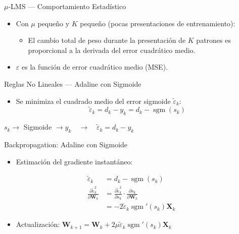 \documentclass[aspectratio=169,utf8,spanish]{beamer}
\DeclareMathOperator{\sgm}{sgm}
\begin{document}
\begin{frame}{$\mu$-LMS — Comportamiento Estadístico}
  \begin{itemize}
    \item Con $\mu$ pequeño y $K$ pequeño (pocas presentaciones de entrenamiento):
    \begin{itemize}
      \item El cambio total de peso durante la presentación de $K$ patrones es proporcional a la derivada del error cuadrático medio.
    \end{itemize}
    \item $\varepsilon$ es la función de error cuadrático medio (MSE).
  \end{itemize}
\end{frame}

\begin{frame}{Reglas No Lineales — Adaline con Sigmoide}
  \begin{itemize}
    \item Se minimiza el cuadrado medio del error sigmoide $\tilde{\varepsilon}_k$:
    \begin{equation*}
      \tilde{\varepsilon}_k = d_k - y_k = d_k - \sgm(s_k)
    \end{equation*}
  \end{itemize}

  \begin{center}
    $s_k \to$ Sigmoide $\to y_k \quad\to\quad \tilde{\varepsilon}_k = d_k - y_k$
  \end{center}
\end{frame}


\begin{frame}{Backpropagation: Adaline con Sigmoide}
  \begin{itemize}
    \item Estimación del gradiente instantáneo:
  \end{itemize}
  \begin{align*}
    \tilde{\varepsilon}_k &= d_k - \sgm(s_k) \\
    \frac{\partial \tilde{\varepsilon}_k^2}{\partial \mathbf{W}_k}
    &= \frac{\partial \tilde{\varepsilon}_k^2}{\partial s_k} \cdot \frac{\partial s_k}{\partial \mathbf{W}_k} \\
    &= -2\tilde{\varepsilon}_k \sgm'(s_k) \mathbf{X}_k
  \end{align*}
  \begin{itemize}
    \item Actualización:
    $\mathbf{W}_{k+1} = \mathbf{W}_k + 2\mu\tilde{\varepsilon}_k \sgm'(s_k) \mathbf{X}_k$
  \end{itemize}
\end{frame}
\end{document}
